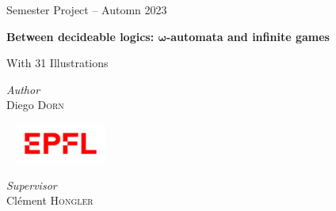\begin{titlepage}
\begin{center}
    \Large
    \textsf{Semester Project -- Automn 2023}

    \vspace{1em}

    \textbf{\textsf{
        \Huge
        Between decideable logics: $\boldsymbol\omega$-automata and infinite games
    }}

    \begin{center}
        With 31 Illustrations
    \end{center}


    \vfill

    \begin{center}
        \normalsize
        \scalebox{0.8}{
        }
    \end{center}

    \vfill


    \begin{minipage}{0.3\textwidth}
        \textit{Author} \\
        Diego \textsc{Dorn}
    \end{minipage}
    ~
    \includegraphics[width=3cm]{epfl.png}
    ~
    \begin{minipage}{0.3\textwidth}
        \begin{flushright}
            \textit{Supervisor} \\
            Clément \textsc{Hongler}
        \end{flushright}
    \end{minipage}
    \vspace{1cm}

    \vspace*{-3cm}
\end{center}
\end{titlepage}